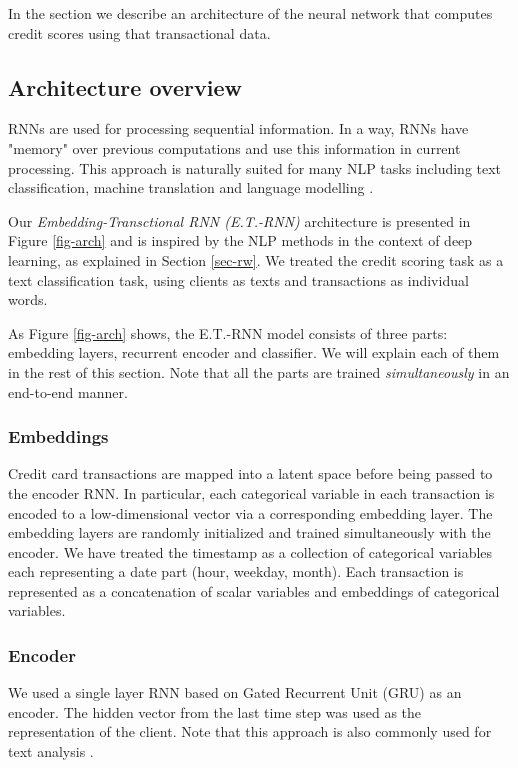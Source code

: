 \documentclass[sigconf]{acmart}
\begin{document}
In the section we describe an architecture of the neural network that computes credit scores using that transactional data.

\subsection{Architecture overview}

RNNs are used for processing sequential information.  In a way, RNNs have "memory" over previous computations and use this information in current processing. This approach is naturally suited for many NLP tasks including text classification, machine translation and language modelling \cite{mikolov2010recurrent}.

Our \textit{Embedding-Transctional RNN (E.T.-RNN)} architecture is presented in Figure \ref{fig-arch} and is inspired by the NLP methods in the context of deep learning, as explained in Section \ref{sec-rw}. We treated the credit scoring task as a text classification task, using clients as texts and transactions as individual words.

As Figure \ref{fig-arch} shows, the E.T.-RNN model consists of three parts: embedding layers, recurrent encoder and classifier. We will explain each of them in the rest of this section. Note that all the parts are trained \textit{simultaneously} in an end-to-end manner.

\subsubsection{Embeddings}

Credit card transactions are mapped into a latent space before being passed to the encoder RNN. In particular, each categorical variable in each transaction is encoded to a low-dimensional vector via a corresponding embedding layer. The embedding layers are randomly initialized and trained simultaneously with the encoder. We have treated the timestamp as a collection of categorical variables each representing a date part (hour, weekday, month). Each transaction is represented as a concatenation of scalar variables and embeddings of categorical variables.

\subsubsection{Encoder}

We used a single layer RNN based on Gated Recurrent Unit (GRU) \cite{DBLP:journals/corr/ChoMGBSB14} as an encoder.  The hidden vector from the last time step was used as the representation of the client. Note that this approach is also commonly used for text analysis \cite{NIPS2014_5346}.
\end{document}
